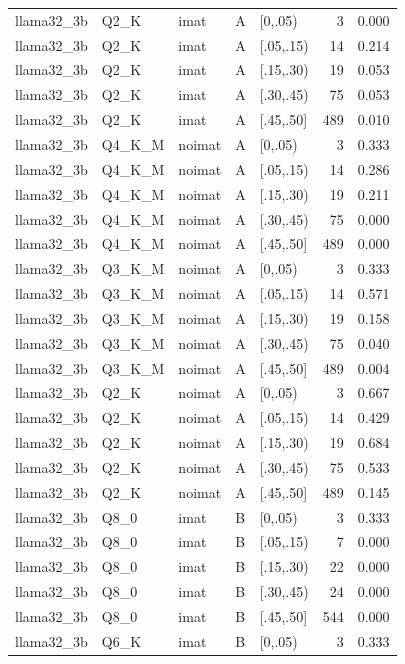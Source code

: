 \begin{tabular}{lllllrr}
llama32\_3b & Q2\_K & imat & A & [0,.05) & 3 & 0.000 \\
llama32\_3b & Q2\_K & imat & A & [.05,.15) & 14 & 0.214 \\
llama32\_3b & Q2\_K & imat & A & [.15,.30) & 19 & 0.053 \\
llama32\_3b & Q2\_K & imat & A & [.30,.45) & 75 & 0.053 \\
llama32\_3b & Q2\_K & imat & A & [.45,.50] & 489 & 0.010 \\
llama32\_3b & Q4\_K\_M & noimat & A & [0,.05) & 3 & 0.333 \\
llama32\_3b & Q4\_K\_M & noimat & A & [.05,.15) & 14 & 0.286 \\
llama32\_3b & Q4\_K\_M & noimat & A & [.15,.30) & 19 & 0.211 \\
llama32\_3b & Q4\_K\_M & noimat & A & [.30,.45) & 75 & 0.000 \\
llama32\_3b & Q4\_K\_M & noimat & A & [.45,.50] & 489 & 0.000 \\
llama32\_3b & Q3\_K\_M & noimat & A & [0,.05) & 3 & 0.333 \\
llama32\_3b & Q3\_K\_M & noimat & A & [.05,.15) & 14 & 0.571 \\
llama32\_3b & Q3\_K\_M & noimat & A & [.15,.30) & 19 & 0.158 \\
llama32\_3b & Q3\_K\_M & noimat & A & [.30,.45) & 75 & 0.040 \\
llama32\_3b & Q3\_K\_M & noimat & A & [.45,.50] & 489 & 0.004 \\
llama32\_3b & Q2\_K & noimat & A & [0,.05) & 3 & 0.667 \\
llama32\_3b & Q2\_K & noimat & A & [.05,.15) & 14 & 0.429 \\
llama32\_3b & Q2\_K & noimat & A & [.15,.30) & 19 & 0.684 \\
llama32\_3b & Q2\_K & noimat & A & [.30,.45) & 75 & 0.533 \\
llama32\_3b & Q2\_K & noimat & A & [.45,.50] & 489 & 0.145 \\
llama32\_3b & Q8\_0 & imat & B & [0,.05) & 3 & 0.333 \\
llama32\_3b & Q8\_0 & imat & B & [.05,.15) & 7 & 0.000 \\
llama32\_3b & Q8\_0 & imat & B & [.15,.30) & 22 & 0.000 \\
llama32\_3b & Q8\_0 & imat & B & [.30,.45) & 24 & 0.000 \\
llama32\_3b & Q8\_0 & imat & B & [.45,.50] & 544 & 0.000 \\
llama32\_3b & Q6\_K & imat & B & [0,.05) & 3 & 0.333 \\

\end{tabular}
